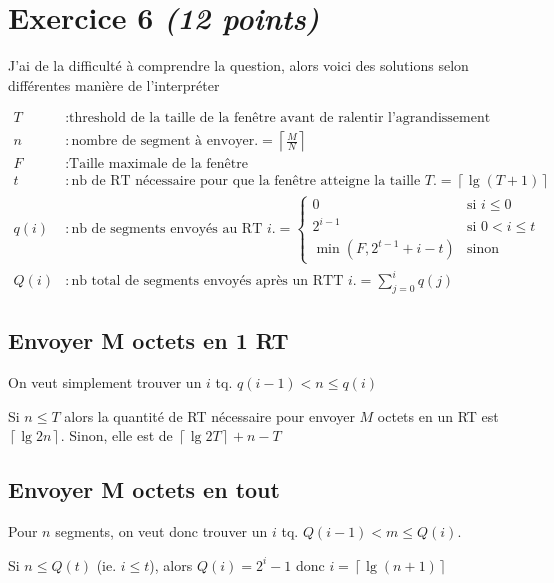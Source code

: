 \documentclass{article}
\begin{document}
\clearpage

\section{Exercice 6 \emph{(12 points)}}
J'ai de la difficulté à comprendre la question, alors voici des solutions selon différentes manière de l'interpréter

\begin{align*}
    T &: \text{threshold de la taille de la fenêtre avant de ralentir l'agrandissement} \\
    n &: \text{nombre de segment à envoyer.} = \left\lceil \frac{M}{N} \right\rceil \\
    F &: \text{Taille maximale de la fenêtre} \\
    t &: \text{nb de RT nécessaire pour que la fenêtre atteigne la taille $T$.} = \left\lceil\lg(T+1)\right\rceil \\
    q(i) &: \text{nb de segments envoyés au RT $i$.} = 
    \left\{\begin{array}{ll}
         0 & \text{si } i\leq 0 \\
         2^{i-1} & \text{si } 0 < i \leq t \\
         \min(F, 2^{t-1}+i-t) & \text{sinon}
    \end{array}\right.\\
    Q(i) &: \text{nb total de segments envoyés après un RTT $i$.} = \displaystyle\sum_{j=0}^{i} q(j)
\end{align*}

\subsection{Envoyer M octets en 1 RT}
On veut simplement trouver un $i$ tq. $q(i-1) < n \leq q(i)$

Si $n \leq T$ alors la quantité de RT nécessaire pour envoyer $M$ octets en un RT est $\left\lceil\lg{2n}\right\rceil$.
Sinon, elle est de $\left\lceil\lg{2T}\right\rceil + n - T$

\subsection{Envoyer M octets en tout}
Pour $n$ segments, on veut donc trouver un $i$ tq. $Q(i-1) < m \leq Q(i)$.

Si $n \leq Q(t)$ (ie. $i \leq t$), alors $Q(i) = 2^i - 1$ donc $i = \left\lceil\lg(n+1)\right\rceil$

\clearpage
\end{document}
